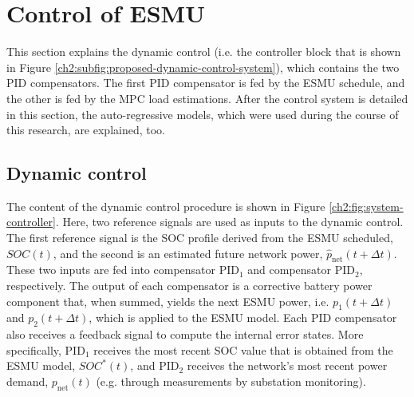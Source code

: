 \section{Control of ESMU}
\label{ch2:sec:control-of-esmu}



This section explains the dynamic control (i.e. the controller block that is shown in Figure \ref{ch2:subfig:proposed-dynamic-control-system}), which contains the two PID compensators.
The first PID compensator is fed by the ESMU schedule, and the other is fed by the MPC load estimations.
After the control system is detailed in this section, the auto-regressive models, which were used during the course of this research, are explained, too.

\subsection{Dynamic control}

The content of the dynamic control procedure is shown in Figure \ref{ch2:fig:system-controller}.
Here, two reference signals are used as inputs to the dynamic control.
The first reference signal is the SOC profile derived from the ESMU scheduled, $SOC(t)$, and the second is an estimated future network power, $\hat{p}_\text{net}(t+\Delta t)$.
These two inputs are fed into compensator PID$_1$ and compensator PID$_2$, respectively.
The output of each compensator is a corrective battery power component that, when summed, yields the next ESMU power, i.e. $p_1(t+\Delta t)$ and $p_2(t+\Delta t)$, which is applied to the ESMU model.
Each PID compensator also receives a feedback signal to compute the internal error states.
More specifically, PID$_1$ receives the most recent SOC value that is obtained from the ESMU model, $SOC^*(t)$, and PID$_2$ receives the network's most recent power demand, $p_\text{net}(t)$ (e.g. through measurements by substation monitoring).

